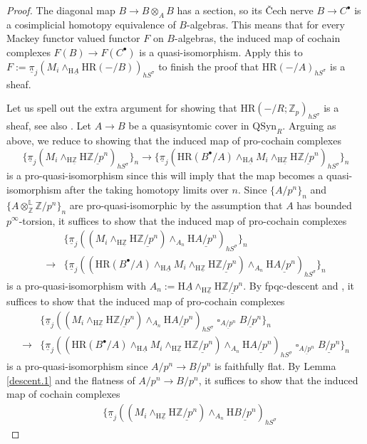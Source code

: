 \documentclass[10pt]{amsart}
\theoremstyle{definition}
\numberwithin{equation}{section}
\renewcommand{\L}{\mathbb{L}}
\newcommand{\Z}{\mathbb{Z}}
\newcommand{\rH}{\mathrm{H}}
\newcommand{\ul}{\underline}
\DeclareMathOperator{\sotimes}{\square}
\newcommand{\QSyn}{\mathrm{QSyn}}
\newcommand{\HR}{\mathrm{HR}}
\begin{document}
{\begin{proof}
The diagonal map $B\to B\otimes_A B$ has a section,
so its \v{C}ech nerve $B\to C^\bullet$ is a cosimplicial homotopy equivalence of $B$-algebras.
This means that for every Mackey functor valued functor $F$ on $B$-algebras,
the induced map of cochain complexes $F(B)\to F(C^\bullet)$ is a quasi-isomorphism.
Apply this to $F:=\ul{\pi}_j (M_i\wedge_{\rH \ul{A}} \HR(-/B))_{hS^\sigma}$ to finish the proof that $\HR(-/A)_{hS^\sigma}$ is a sheaf.

Let us spell out the extra argument for showing that $\HR(-/R;\Z_p)_{hS^\sigma}$ is a sheaf,
see also \cite[Remark 4.9]{BMS19}.
Let $A\to B$ be a quasisyntomic cover in $\QSyn_R$.
Arguing as above,
we reduce to showing that the induced map of pro-cochain complexes 
\[
\{
\ul{\pi}_j (M_i\wedge_{\rH \ul{\Z}}\rH \ul{\Z/p^n})_{hS^\sigma}
\}_n
\to
\{
\ul{\pi}_j (\HR(B^\bullet/A)\wedge_{\rH \ul{A}} M_i\wedge_{\rH \ul{\Z}}\rH \ul{\Z/p^n})_{hS^\sigma}
\}_n
\]
is a pro-quasi-isomorphism since this will imply that the map becomes a quasi-isomorphism after the taking homotopy limits over $n$.
Since $\{A/p^n\}_n$ and $\{A\otimes_{\Z}^\L\Z/p^n\}_n$ are pro-quasi-isomorphic by the assumption that $A$ has bounded $p^\infty$-torsion,
it suffices to show that the induced map of pro-cochain complexes 
\begin{align*}
&\{
\ul{\pi}_j ((M_i\wedge_{\rH \ul{\Z}}\rH \ul{\Z/p^n})\wedge_{A_n} \rH \ul{A/p^n})_{hS^\sigma}
\}_n
\\
\to &
\{
\ul{\pi}_j ((\HR(B^\bullet/A)\wedge_{\rH \ul{A}} M_i\wedge_{\rH \ul{\Z}}\rH \ul{\Z/p^n})\wedge_{A_n} \rH \ul{A/p^n})_{hS^\sigma}
\}_n
\end{align*}
is a pro-quasi-isomorphism with $A_n:=\rH \ul{A}\wedge_{\rH \ul{\Z}}\rH \ul{\Z/p^n}$.
By fpqc-descent and \cite[Lemma 2.17]{HP},
it suffices to show that the induced map of pro-cochain complexes
\begin{align*}
&\{
\ul{\pi}_j ((M_i\wedge_{\rH \ul{\Z}}\rH \ul{\Z/p^n})\wedge_{A_n} \rH \ul{A/p^n})_{hS^\sigma}\sotimes_{\ul{A/p^n}}\ul{B/p^n}
\}_n
\\
\to &
\{
\ul{\pi}_j ((\HR(B^\bullet/A)\wedge_{\rH \ul{A}} M_i\wedge_{\rH \ul{\Z}}\rH \ul{\Z/p^n})\wedge_{A_n} \rH \ul{A/p^n})_{hS^\sigma}\sotimes_{\ul{A/p^n}}\ul{B/p^n}
\}_n
\end{align*}
is a pro-quasi-isomorphism since $A/p^n\to B/p^n$ is faithfully flat.
By Lemma \ref{descent.1} and the flatness of $A/p^n\to B/p^n$,
it suffices to show that the induced map of cochain complexes
\begin{align*}
&\{
\ul{\pi}_j ((M_i\wedge_{\rH \ul{\Z}}\rH \ul{\Z/p^n})\wedge_{A_n} \rH \ul{B/p^n})_{hS^\sigma}

\end{align*}
\end{proof}}
\end{document}
